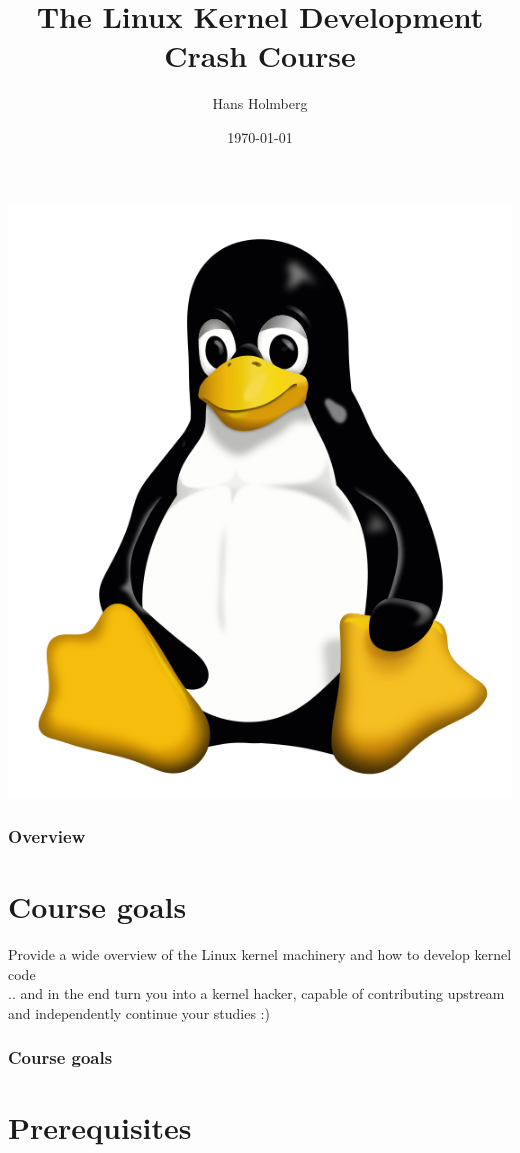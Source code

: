 \documentclass{beamer}
\title[TLKDCC Intro]{The Linux Kernel Development Crash Course}
\author{Hans Holmberg}
\institute[LKTP]
{
Linux Kernel Teaching Project \\ 
\medskip
\textit{hans.holmberg@gmail.com}
}
\date{\today}
\begin{document}
\begin{frame}
\titlepage
\includegraphics{../common/tux}
\end{frame}

\begin{frame}
\frametitle{Overview}
\tableofcontents 
\end{frame}

\section{Course goals} 

\begin{frame}
Provide a wide overview of the Linux kernel machinery and how to develop kernel code \\
.. and in the end turn you into a kernel hacker, capable of contributing upstream and independently continue your studies :)
\frametitle{Course goals}
\end{frame}

\section{Prerequisites}
\end{document}
